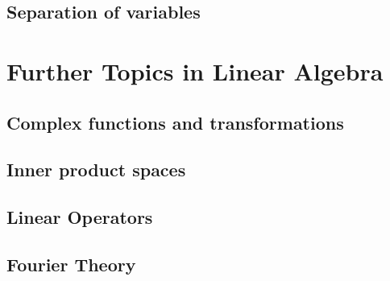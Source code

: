 \documentclass[12pt,letterpaper, openany]{book} %
\begin{document}
\chapter{Separation of variables}


\part{Further Topics in Linear Algebra}



\chapter{Complex functions and transformations}
 

\chapter{Inner product spaces}


\chapter{Linear Operators}


\chapter{Fourier Theory}




%


 
\newenvironment{changemargin}[1]{%
\begin{list}{}{%
\setlength{\topsep}{#1}
\setlength{\listparindent}{\parindent}%
\setlength{\itemindent}{\parindent}%
\setlength{\parsep}{\parskip}%
}%
\item[]}{\end{list}}

\begin{changemargin}{0cm}
\printindex 
\end{changemargin}

 
\end{document}
